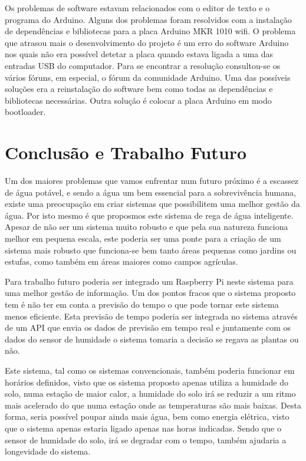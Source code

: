 \documentclass[conference]{IEEEtran}
\begin{document}
Os problemas de software estavam relacionados com o editor de texto e o programa do Arduino. Alguns dos problemas 
foram resolvidos com a instalação de dependências e bibliotecas para a placa Arduino MKR 1010 wifi. 
O problema que atrasou mais o desenvolvimento do projeto é um erro do software Arduino nos quais não era possível 
detetar a placa quando estava ligada a uma das entradas USB do computador. Para se encontrar a resolução 
consultou-se os vários fóruns, em especial, o fórum da comunidade Arduino. Uma das possíveis soluções era a 
reinstalação do software bem como todas as dependências e bibliotecas necessárias. Outra solução é colocar a 
placa Arduino em modo bootloader. \cite{arduinoport}

\section{Conclusão e Trabalho Futuro}

Um dos maiores problemas que vamos enfrentar num futuro próximo é a escassez de água potável,
e sendo a água um bem essencial para a sobrevivência humana, existe uma preocupação 
em criar sistemas que possibilitem uma melhor gestão da água. Por isto mesmo 
é que proposmos este sistema de rega de água inteligente. Apesar de não ser um 
sistema muito robusto e que pela sua natureza funciona melhor em pequena escala, este 
poderia ser uma ponte para a criação de um sistema mais robusto que funciona-se bem 
tanto áreas pequenas como jardins ou estufas, como também em áreas maiores como campos agrículas.

Para trabalho futuro poderia ser integrado um Raspberry Pi neste sistema para uma melhor 
gestão de informação. Um dos pontos fracos que o sistema proposto tem é não 
ter em conta a previsão do tempo o que pode tornar este sistema menos eficiente. 
Esta previsão de tempo poderia ser integrada no sistema através de um API que 
envia os dados de previsão em tempo real e juntamente com os dados do sensor de 
humidade o sistema tomaria a decisão se regava as plantas ou não.

Este sistema, tal como os sistemas convencionais, também poderia funcionar em horários definidos, 
visto que os sistema proposto apenas utiliza a humidade do solo, numa estação de maior calor, a humidade do solo 
irá se reduzir a um ritmo mais acelerado do que numa estação onde as temperaturas são mais baixas. Desta forma, 
seria possível poupar ainda mais água, bem como energia elétrica, visto que o sistema apenas estaria ligado apenas 
nas horas indicadas. Sendo que o sensor de humidade do solo, irá se degradar com o tempo, também ajudaria a 
longevidade do sistema.
\end{document}
